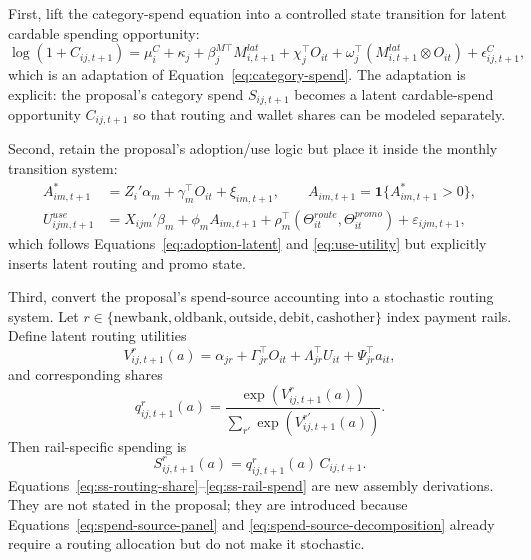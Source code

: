 \documentclass[11pt]{article}
\newcommand{\1}{\mathbf{1}}
\begin{document}
First, lift the category-spend equation into a controlled state transition for
latent cardable spending opportunity:
\begin{equation}
  \log(1+C_{ij,t+1})
  =
  \mu_i^{C} + \kappa_j + \beta_j^{M\top}M^{lat}_{i,t+1}
  + \chi_j^{\top}O_{it}
  + \omega_j^{\top}(M^{lat}_{i,t+1}\otimes O_{it})
  + \epsilon^C_{ij,t+1},
  \label{eq:ss-cardable-spend}
\end{equation}
which is an adaptation of Equation~\eqref{eq:category-spend}. The adaptation is
explicit: the proposal's category spend $S_{ij,t+1}$ becomes a latent
cardable-spend opportunity $C_{ij,t+1}$ so that routing and wallet shares can be
modeled separately.

Second, retain the proposal's adoption/use logic but place it inside the
monthly transition system:
\begin{align}
  A^*_{im,t+1}
    &= Z_i'\alpha_m + \gamma_m^{\top}O_{it} + \xi_{im,t+1},
       \qquad A_{im,t+1}=\1\{A^*_{im,t+1}>0\},
       \label{eq:ss-adoption-transition}\\
  U^{use}_{ijm,t+1}
    &= X_{ijm}'\beta_m + \phi_m A_{im,t+1}
       + \rho_m^{\top}(\Theta^{route}_{it},\Theta^{promo}_{it})
       + \varepsilon_{ijm,t+1},
       \label{eq:ss-use-utility}
\end{align}
which follows Equations~\eqref{eq:adoption-latent} and
\eqref{eq:use-utility} but explicitly inserts latent routing and promo state.

Third, convert the proposal's spend-source accounting into a stochastic routing
system. Let $r\in\{\mathrm{newbank},\mathrm{oldbank},\mathrm{outside},\mathrm{debit},\mathrm{cashother}\}$
index payment rails. Define latent routing utilities
\begin{equation}
  V^{r}_{ij,t+1}(a)
  =
  \alpha_{jr} + \Gamma_{jr}^{\top}O_{it} + \Lambda_{jr}^{\top}U_{it}
  + \Psi_{jr}^{\top}a_{it},
  \label{eq:ss-routing-utility}
\end{equation}
and corresponding shares
\begin{equation}
  q^r_{ij,t+1}(a)
  =
  \frac{\exp(V^r_{ij,t+1}(a))}{\sum_{r'}\exp(V^{r'}_{ij,t+1}(a))}.
  \label{eq:ss-routing-share}
\end{equation}
Then rail-specific spending is
\begin{equation}
  S^r_{ij,t+1}(a) = q^r_{ij,t+1}(a)\,C_{ij,t+1}.
  \label{eq:ss-rail-spend}
\end{equation}
Equations~\eqref{eq:ss-routing-share}--\eqref{eq:ss-rail-spend} are new
assembly derivations. They are not stated in the proposal; they are introduced
because Equations~\eqref{eq:spend-source-panel} and
\eqref{eq:spend-source-decomposition} already require a routing allocation but
do not make it stochastic.
\end{document}
